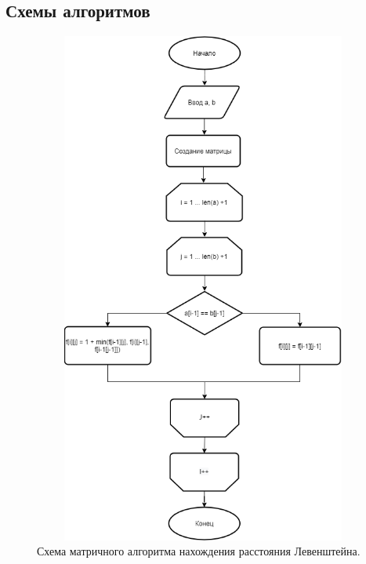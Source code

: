 \documentclass[a4paper,12pt]{article}
\begin{document}
\subsection{Схемы алгоритмов}
\begin{figure}[H]
	\centering
	\includegraphics[width=12cm, height= 17cm]{diaglev.png}
	\captionsetup{justification=centering}
	\caption{Схема матричного алгоритма нахождения расстояния Левенштейна.}
	\label{Рис 1}
\end{figure}
\end{document}
